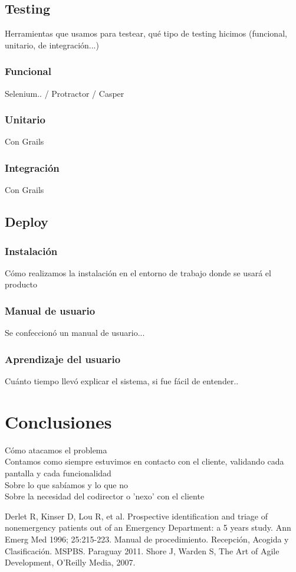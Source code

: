 \documentclass[a4paper,10pt]{article}
\begin{document}
\subsection{Testing}
Herramientas que usamos para testear, qué tipo de testing hicimos (funcional, unitario, de integración...)
\subsubsection{Funcional}
Selenium.. / Protractor / Casper
\subsubsection{Unitario}
Con Grails
\subsubsection{Integración}
Con Grails
\subsection{Deploy}
\subsubsection{Instalación}
Cómo realizamos la instalación en el entorno de trabajo donde se usará el producto
\subsubsection{Manual de usuario}
Se confeccionó un manual de usuario...
\subsubsection{Aprendizaje del usuario}
Cuánto tiempo llevó explicar el sistema, si fue fácil de entender..

\newpage 
\section{Conclusiones}
Cómo atacamos el problema\\
Contamos como siempre estuvimos en contacto con el cliente, validando cada pantalla y cada funcionalidad\\
Sobre lo que sabíamos y lo que no\\
Sobre la necesidad del codirector o 'nexo' con el cliente



\newpage 

\begin{thebibliography}{3} 
 Derlet R, Kinser D, Lou R, et al. Prospective identification and triage of nonemergency patients out of an Emergency Department: a 5 years study. Ann Emerg Med 1996; 25:215-223.
 Manual de procedimiento. Recepción,  Acogida y Clasificación.  MSPBS. Paraguay 2011.
 Shore J, Warden S, The Art of Agile Development, O’Reilly Media, 2007.

\end{thebibliography}
 
\end{document}
